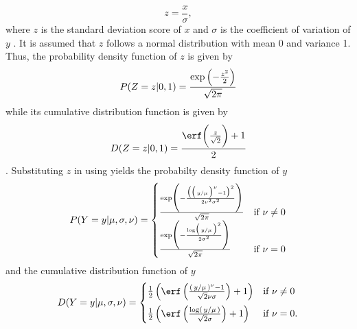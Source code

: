 \begin{equation}
  \label{eq:BoxCoxColeGreenSDScore}
  z = \frac{x}{\sigma},
\end{equation}
where \(z\) is the standard deviation score of \(x\) and \(\sigma\) is the coefficient of variation of \(y\) .  It is assumed that \(z\) follows a normal distribution with mean 0 and variance 1. Thus, the probability density function of \(z\) is given by
\begin{equation}
  \label{eq:StandardNormalDistributionPDF}
  P(Z = z|0, 1) =
  \frac{\exp{\Bigl(-\frac{z^2}{2}\Bigr)}}{\sqrt{2 \pi}}
\end{equation}
while its cumulative distribution function is given by
\begin{equation}
  \label{eq:StandardNormalDistributionCDF}
  D(Z = z|0, 1) =
  \frac{\erf\biggl(\frac{z}{\sqrt{2}}\biggr) + 1}{2}
  \end{equation}
\parencite{Henze2013,Weisstein2017c}.  Substituting \(z\) in  using  yields the probabilty density function of \(y\)
\begin{equation}
  \label{eq:BoxCoxColeGreenDistributionPDF}
  P(Y = y|\mu, \sigma, \nu) =
  \begin{cases}
    \frac{\exp\Biggl(-\frac{\bigl(\bigl(\left.y \middle/ \mu\right.\bigr)^\nu - 1\bigr)^2}{2 \nu^2 \sigma^2}\Biggr)}{\sqrt{2 \pi}} &\text{if } \nu \not = 0 \\
    \frac{\exp\Biggl(-\frac{\log\bigl(\left.y \middle/ \mu\right.\bigr)^2}{2 \sigma^2}\Biggr)}{\sqrt{2 \pi}} &\text{if } \nu = 0
  \end{cases}
\end{equation}
and the cumulative distribution function of \(y\)
\begin{equation}
  \label{eq:BoxCoxColeGreenDistributionCDF}
  D(Y = y|\mu, \sigma, \nu) =
  \begin{cases}
    \frac{1}{2} \left(\erf\left(\frac{\left(\left. y \middle/ \mu \right.\right)^\nu - 1}{\sqrt{2} \nu \sigma}\right) + 1\right) &\text{if } \nu \not = 0 \vspace{0.5em} \\
    \frac{1}{2} \left(\erf\left(\frac{\log\left(\left. y \middle/ \mu \right.\right)}{\sqrt{2} \sigma}\right) + 1\right) &\text{if } \nu = 0.
  \end{cases}
\end{equation}

